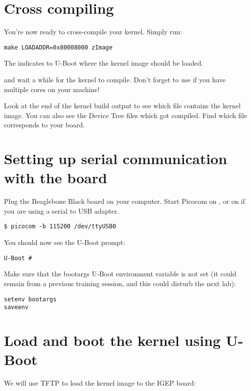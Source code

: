 \section{Cross compiling}

You're now ready to cross-compile your kernel. Simply run:

\begin{verbatim}
make LOADADDR=0x80008000 zImage
\end{verbatim}

The  indicates to U-Boot where the kernel image should
be loaded.

and wait a while for the kernel to compile. Don't forget to use
 if you have multiple cores on your machine!

Look at the end of the kernel build output to see which file contains
the kernel image. You can also see the Device Tree  files
which got compiled. Find which  file corresponds to your
board.

\section{Setting up serial communication with the board}

Plug the Beaglebone Black board on your computer. Start Picocom on
, or on  if you are using a serial
to USB adapter.

\begin{verbatim}
$ picocom -b 115200 /dev/ttyUSB0
\end{verbatim}

You should now see the U-Boot prompt:

\begin{verbatim}
U-Boot #
\end{verbatim}

Make sure that the bootargs U-Boot environment variable is not set (it
could remain from a previous training session, and this could disturb
the next lab):

\begin{verbatim}
setenv bootargs
saveenv
\end{verbatim}

\section{Load and boot the kernel using U-Boot}

We will use TFTP to load the kernel image to the IGEP board:

